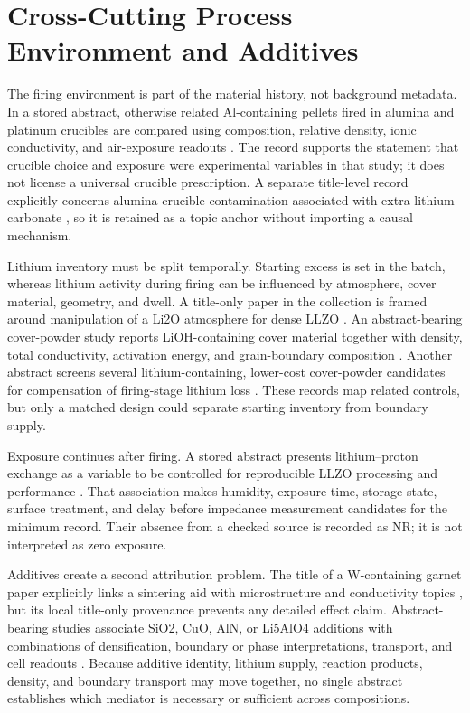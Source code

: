 \section{Cross-Cutting Process Environment and Additives}

The firing environment is part of the material history, not background metadata. In a stored abstract, otherwise related Al-containing pellets fired in alumina and platinum crucibles are compared using composition, relative density, ionic conductivity, and air-exposure readouts \cite{xia2016ionic}. The record supports the statement that crucible choice and exposure were experimental variables in that study; it does not license a universal crucible prescription. A separate title-level record explicitly concerns alumina-crucible contamination associated with extra lithium carbonate \cite{lan2019investigation}, so it is retained as a topic anchor without importing a causal mechanism.

Lithium inventory must be split temporally. Starting excess is set in the batch, whereas lithium activity during firing can be influenced by atmosphere, cover material, geometry, and dwell. A title-only paper in the collection is framed around manipulation of a Li2O atmosphere for dense LLZO \cite{huang2019manipulating}. An abstract-bearing cover-powder study reports LiOH-containing cover material together with density, total conductivity, activation energy, and grain-boundary composition \cite{zhang2019densification}. Another abstract screens several lithium-containing, lower-cost cover-powder candidates for compensation of firing-stage lithium loss \cite{huang2019searching}. These records map related controls, but only a matched design could separate starting inventory from boundary supply.

Exposure continues after firing. A stored abstract presents lithium--proton exchange as a variable to be controlled for reproducible LLZO processing and performance \cite{rosen2021controlling}. That association makes humidity, exposure time, storage state, surface treatment, and delay before impedance measurement candidates for the minimum record. Their absence from a checked source is recorded as NR; it is not interpreted as zero exposure.

Additives create a second attribution problem. The title of a W-containing garnet paper explicitly links a sintering aid with microstructure and conductivity topics \cite{luo2019influence}, but its local title-only provenance prevents any detailed effect claim. Abstract-bearing studies associate SiO2, CuO, AlN, or Li5AlO4 additions with combinations of densification, boundary or phase interpretations, transport, and cell readouts \cite{zhang2020enhanced,zhang2019effects,zhang2022high,zhou2024li5alo4}. Because additive identity, lithium supply, reaction products, density, and boundary transport may move together, no single abstract establishes which mediator is necessary or sufficient across compositions.

